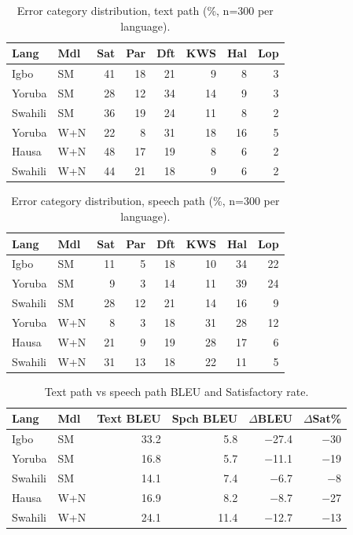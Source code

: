 
\begin{table}[t]
\centering
\small
\setlength{\tabcolsep}{3pt}
\caption{Error category distribution, text path (\%, n=300 per language).}
\label{tab:p4_text_errors}
\begin{tabular}{llrrrrrr}
\toprule
\textbf{Lang} & \textbf{Mdl} & \textbf{Sat} & \textbf{Par} & \textbf{Dft} & \textbf{KWS} & \textbf{Hal} & \textbf{Lop} \\
\midrule
Igbo   & SM  & 41 & 18 & 21 &  9 &  8 &  3 \\
Yoruba & SM  & 28 & 12 & 34 & 14 &  9 &  3 \\
Swahili& SM  & 36 & 19 & 24 & 11 &  8 &  2 \\
Yoruba & W+N & 22 &  8 & 31 & 18 & 16 &  5 \\
Hausa  & W+N & 48 & 17 & 19 &  8 &  6 &  2 \\
Swahili& W+N & 44 & 21 & 18 &  9 &  6 &  2 \\
\bottomrule
\end{tabular}
\end{table}

\begin{table}[t]
\centering
\small
\setlength{\tabcolsep}{3pt}
\caption{Error category distribution, speech path (\%, n=300 per language).}
\label{tab:p4_speech_errors}
\begin{tabular}{llrrrrrr}
\toprule
\textbf{Lang} & \textbf{Mdl} & \textbf{Sat} & \textbf{Par} & \textbf{Dft} & \textbf{KWS} & \textbf{Hal} & \textbf{Lop} \\
\midrule
Igbo   & SM  & 11 &  5 & 18 & 10 & 34 & 22 \\
Yoruba & SM  &  9 &  3 & 14 & 11 & 39 & 24 \\
Swahili& SM  & 28 & 12 & 21 & 14 & 16 &  9 \\
Yoruba & W+N &  8 &  3 & 18 & 31 & 28 & 12 \\
Hausa  & W+N & 21 &  9 & 19 & 28 & 17 &  6 \\
Swahili& W+N & 31 & 13 & 18 & 22 & 11 &  5 \\
\bottomrule
\end{tabular}
\end{table}

\begin{table}[t]
\centering
\small
\caption{Text path vs speech path BLEU and Satisfactory rate.}
\label{tab:p4_path_gap}
\begin{tabular}{llrrrr}
\toprule
\textbf{Lang} & \textbf{Mdl} & \textbf{Text BLEU} & \textbf{Spch BLEU} & \textbf{$\Delta$BLEU} & \textbf{$\Delta$Sat\%} \\
\midrule
Igbo   & SM  & 33.2 &  5.8 & $-$27.4 & $-$30 \\
Yoruba & SM  & 16.8 &  5.7 & $-$11.1 & $-$19 \\
Swahili& SM  & 14.1 &  7.4 & $-$6.7  & $-$8  \\
Hausa  & W+N & 16.9 &  8.2 & $-$8.7  & $-$27 \\
Swahili& W+N & 24.1 & 11.4 & $-$12.7 & $-$13 \\
\bottomrule
\end{tabular}
\end{table}

